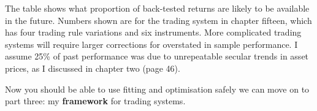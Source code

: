 The table shows what proportion of back-tested returns are likely to be available in the future. Numbers shown are for the trading system in chapter fifteen, which has four trading rule variations and six instruments. More complicated trading systems will require larger corrections for overstated in sample performance. I assume 25\% of past performance was due to unrepeatable secular trends in asset prices, as I discussed in chapter two (page 46).

Now you should be able to use fitting and optimisation safely we can move on to part three: my \textbf{framework} for trading systems.
